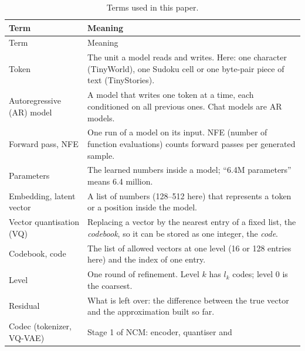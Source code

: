 \documentclass[
  british,
]{article}
\begin{document}
\begin{longtable}[]{@{}
  >{\raggedright\arraybackslash}p{}
  >{\raggedright\arraybackslash}p{}@{}}
\caption{Terms used in this paper.}\tabularnewline
\toprule\noalign{}
\begin{minipage}[b]{\linewidth}\raggedright
Term
\end{minipage} & \begin{minipage}[b]{\linewidth}\raggedright
Meaning
\end{minipage} \\
\midrule\noalign{}
\endfirsthead
\toprule\noalign{}
\begin{minipage}[b]{\linewidth}\raggedright
Term
\end{minipage} & \begin{minipage}[b]{\linewidth}\raggedright
Meaning
\end{minipage} \\
\midrule\noalign{}
\endhead
\bottomrule\noalign{}
\endlastfoot
Token & The unit a model reads and writes. Here: one character
(TinyWorld), one Sudoku cell or one byte-pair piece of text
(TinyStories). \\
Autoregressive (AR) model & A model that writes one token at a time,
each conditioned on all previous ones. Chat models are AR models. \\
Forward pass, NFE & One run of a model on its input. NFE (number of
function evaluations) counts forward passes per generated sample. \\
Parameters & The learned numbers inside a model; ``6.4M parameters''
means 6.4 million. \\
Embedding, latent vector & A list of numbers (128--512 here) that
represents a token or a position inside the model. \\
Vector quantisation (VQ) & Replacing a vector by the nearest entry of a
fixed list, the \emph{codebook}, so it can be stored as one integer, the
\emph{code}. \\
Codebook, code & The list of allowed vectors at one level (16 or 128
entries here) and the index of one entry. \\
Level & One round of refinement. Level \(k\) has \(l_k\) codes; level 0
is the coarsest. \\
Residual & What is left over: the difference between the true vector and
the approximation built so far. \\
Codec (tokenizer, VQ-VAE) & Stage 1 of NCM: encoder, quantiser and

\end{longtable}
\end{document}
